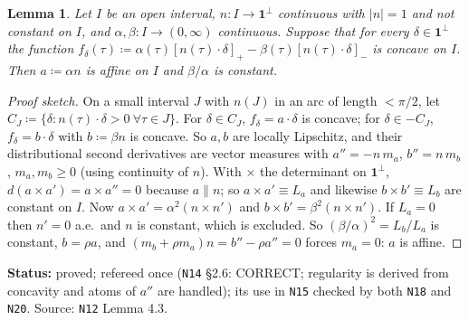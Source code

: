 \documentclass[11pt]{article}
\newtheorem{lemma}[theorem]{Lemma}
\theoremstyle{definition}
\theoremstyle{remark}
\newcommand{\one}{\mathbf 1}
\newcommand{\src}[1]{\texttt{#1}}
\newcommand{\status}[1]{\par\smallskip\noindent\textbf{Status:} #1\par\smallskip}
\begin{document}
\begin{lemma}\label{lem:twoslope}
Let $I$ be an open interval, $n:I\to\one^\perp$ continuous with $|n|=1$ and not constant on $I$, and $\alpha,\beta:I\to(0,\infty)$ continuous. Suppose that for every $\delta\in\one^\perp$ the function $f_\delta(\tau)\coloneqq\alpha(\tau)[n(\tau)\cdot\delta]_+-\beta(\tau)[n(\tau)\cdot\delta]_-$ is concave on $I$. Then $a\coloneqq\alpha n$ is affine on $I$ and $\beta/\alpha$ is constant.
\end{lemma}
\begin{proof}[Proof sketch]
On a small interval $J$ with $n(J)$ in an arc of length $<\pi/2$, let $C_J\coloneqq\{\delta:n(\tau)\cdot\delta>0\ \forall\tau\in J\}$. For $\delta\in C_J$, $f_\delta=a\cdot\delta$ is concave; for $\delta\in-C_J$, $f_\delta=b\cdot\delta$ with $b\coloneqq\beta n$ is concave. So $a,b$ are locally Lipschitz, and their distributional second derivatives are vector measures with $a''=-n\,m_a$, $b''=n\,m_b$, $m_a,m_b\ge0$ (using continuity of $n$). With $\times$ the determinant on $\one^\perp$, $d(a\times a')=a\times a''=0$ because $a\parallel n$; so $a\times a'\equiv L_a$ and likewise $b\times b'\equiv L_b$ are constant on $I$. Now $a\times a'=\alpha^2(n\times n')$ and $b\times b'=\beta^2(n\times n')$. If $L_a=0$ then $n'=0$ a.e.\ and $n$ is constant, which is excluded. So $(\beta/\alpha)^2=L_b/L_a$ is constant, $b=\rho a$, and $(m_b+\rho m_a)n=b''-\rho a''=0$ forces $m_a=0$: $a$ is affine.
\end{proof}
\status{proved; refereed once (\src{N14} \S2.6: CORRECT; regularity is derived from concavity and atoms of $a''$ are handled); its use in \src{N15} checked by both \src{N18} and \src{N20}. Source: \src{N12} Lemma 4.3.}
\end{document}
